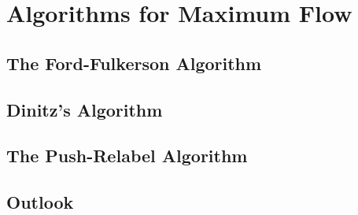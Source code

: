 
\chapter{Algorithms for Maximum Flow}

\section{The Ford-Fulkerson Algorithm}
\section{Dinitz's Algorithm}
\section{The Push-Relabel Algorithm}
\section{Outlook}
